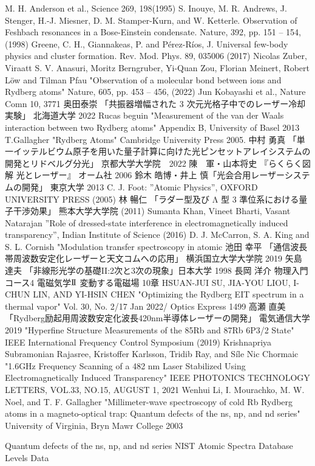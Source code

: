 \begin{thebibliography}{99}
M. H. Anderson et al., Science 269, 198(1995)
S. Inouye, M. R. Andrews, J. Stenger, H.-J. Miesner, D. M. Stamper-Kurn, and W. Ketterle. Observation of Feshbach resonances in a Bose-Einstein condensate. Nature, 392, pp. 151 – 154, (1998)
Greene, C. H., Giannakeas, P. and Pérez-Ríos, J. Universal few-body physics and cluster formation. Rev. Mod. Phys. 89, 035006 (2017)
Nicolas Zuber, Viraatt S. V. Anasuri, Moritz Berngruber, Yi-Quan Zou, Florian Meinert, Robert Löw and Tilman Pfau "Observation of a molecular bond between ions and Rydberg atoms"  Nature, 605, pp. 453 – 456, (2022)
Jun Kobayashi et al., Nature Comn 10, 3771
奥田泰崇 「共振器増幅された 3 次元光格子中でのレーザー冷却実験」 北海道大学 2022
Rucas beguin "Measurement of the van der Waals interaction between two Rydberg atoms" Appendix B, University of Basel 2013
T.Gallagher "Rydberg Atoms" Cambridge University Press 2005.
中村 勇真 「単一イッテルビウム原子を用いた量子計算に向けた光ピンセットアレイシステムの開発とリドベルグ分光」 京都大学大学院　2022
 陳　軍・山本将史 『らくらく図解 光とレーザー』 オーム社 2006
鈴木 皓博・井上 慎「光会合用レーザーシステムの開発」 東京大学 2013
C. J. Foot: ”Atomic Physics”, OXFORD UNIVERSITY PRESS (2005)
林 暢仁 「ラダー型及び Λ 型 3 準位系における量子干渉効果」 熊本大学大学院 (2011)
Sumanta Khan, Vineet Bharti, Vasant Natarajan ”Role of dressed-state interference in electromagnetically induced transparency”, Indian Institute of Science (2016)
D. J. McCarron, S. A. King and S. L. Cornish "Modulation transfer spectroscopy in atomic
池田 幸平 「通信波長帯周波数安定化レーザーと天文コムへの応用」 横浜国立大学大学院 2019
矢島 達夫 「非線形光学の基礎II:2次と3次の現象」日本大学 1998
長岡 洋介 物理入門コース4 電磁気学$\mathrm{I}\hspace{-1.2pt}\mathrm{I}$ 変動する電磁場 10章
HSUAN-JUI SU, JIA-YOU LIOU, I-CHUN LIN, AND YI-HSIN CHEN "Optimizing the Rydberg EIT spectrum in a thermal vapor" Vol. 30, No. 2/17 Jan 2022/ Optics Express 1499
高瀬 直美 「Rydberg励起用周波数安定化波長420nm半導体レーザーの開発」 電気通信大学 2019
"Hyperfine Structure Measurements of the 85Rb and 87Rb 6P3/2 State" IEEE International Frequency Control Symposium (2019)
Krishnapriya Subramonian Rajasree, Kristoffer Karlsson, Tridib Ray, and Síle Nic Chormaic "1.6GHz Frequency Scanning of a 482 nm Laser Stabilized Using Electromagnetically Induced Transparency" IEEE PHOTONICS TECHNOLOGY LETTERS, VOL.33, NO.15, AUGUST 1, 2021
Wenhui Li, I. Mourachko, M. W. Noel, and T. F. Gallagher "Millimeter-wave spectroscopy of cold Rb Rydberg atoms in a magneto-optical trap: Quantum defects of the ns, np, and nd series" University of Virginia, Bryn Mawr College 2003

Quantum defects of the ns, np, and nd series
NIST Atomic Spectra Database Levels Data
\end{thebibliography}